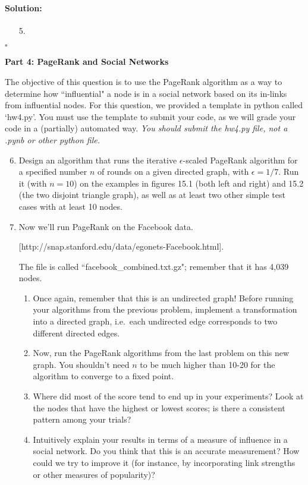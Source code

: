 \documentclass[11pt,letterpaper]{article}
\newif \iftemplate \templatetrue
\newenvironment{solution}{\paragraph{Solution:}}{\hfill$\square$}
\theoremstyle{definition}
\begin{document}
\iftemplate
\begin{solution}
\begin{enumerate}
\item[5.]
\end{enumerate}
\end{solution}
\newpage
\fi


\noindent
{\Large\textbf{Part 4: PageRank and Social Networks}\par}

\medskip

The objective of this question is to use the PageRank algorithm as a way to determine how ``influential" a node is in a social network based on its in-links from influential nodes.
For this question, we provided a template in python called `hw4.py'. You must use the template to submit your code, as we will grade your code in a (partially) automated way. \emph{You should submit the hw4.py file, not a .pynb or other python file.}

\begin{enumerate}
\setcounter{enumi}{5}
\item Design an algorithm that runs the iterative $\epsilon$-scaled PageRank algorithm for a specified number $n$ of rounds on a given directed graph, with $\epsilon = 1/7$. Run it (with $n = 10$) on the examples in figures 15.1 (both left and right) and 15.2 (the two disjoint triangle graph), as well as at least two other simple test cases with at least 10 nodes.

\item Now we'll run PageRank on the Facebook data. 

[http://snap.stanford.edu/data/egonets-Facebook.html].

 The file is called ``facebook\_combined.txt.gz"; remember that it has 4,039 nodes.
\begin{enumerate}
\item Once again, remember that this is an undirected graph! Before running your algorithms from the previous problem, implement a transformation into a directed graph, i.e.\ each undirected edge corresponds
to two different directed edges.
\item Now, run the PageRank algorithms from the last problem on this new graph. You shouldn't need $n$ to be much higher than 10-20 for the algorithm to converge to a fixed point.
\item Where did most of the score tend to end up in your experiments? Look at the nodes that have the highest or lowest scores; is there a consistent pattern among your trials?
\item Intuitively explain your results in terms of a measure of influence in a social network. Do you think that this is an accurate measurement? How could we try to improve it (for instance, by incorporating link strengths or other measures of popularity)?
\end{enumerate}
\end{enumerate}
\end{document}
